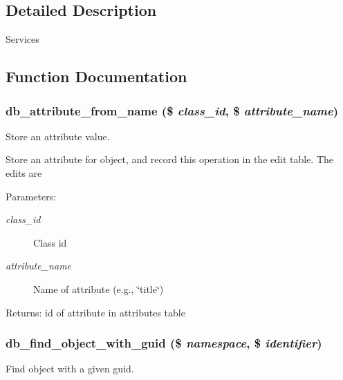 \subsection{Detailed Description}
Services 

\subsection{Function Documentation}
\hypertarget{eav_8php_ddedeb138f0241eedf67dc5e4793ed24}{
\subsubsection{\setlength{\rightskip}{0pt plus 5cm}db\_\-attribute\_\-from\_\-name (\$ {\em class\_\-id}, \/  \$ {\em attribute\_\-name})}}
\label{eav_8php_ddedeb138f0241eedf67dc5e4793ed24}


Store an attribute value. 

Store an attribute for object, and record this operation in the edit table. The edits are

\begin{Desc}
\item[Parameters:]
\begin{description}
\item[{\em class\_\-id}]Class id \item[{\em attribute\_\-name}]Name of attribute (e.g., \char`\"{}title\char`\"{})\end{description}
\end{Desc}
\begin{Desc}
\item[Returns:]id of attribute in attributes table \end{Desc}
\hypertarget{eav_8php_20e4c8a08082ea43f55c778b615d2671}{
\subsubsection{\setlength{\rightskip}{0pt plus 5cm}db\_\-find\_\-object\_\-with\_\-guid (\$ {\em namespace}, \/  \$ {\em identifier})}}
\label{eav_8php_20e4c8a08082ea43f55c778b615d2671}


Find object with a given guid. 

